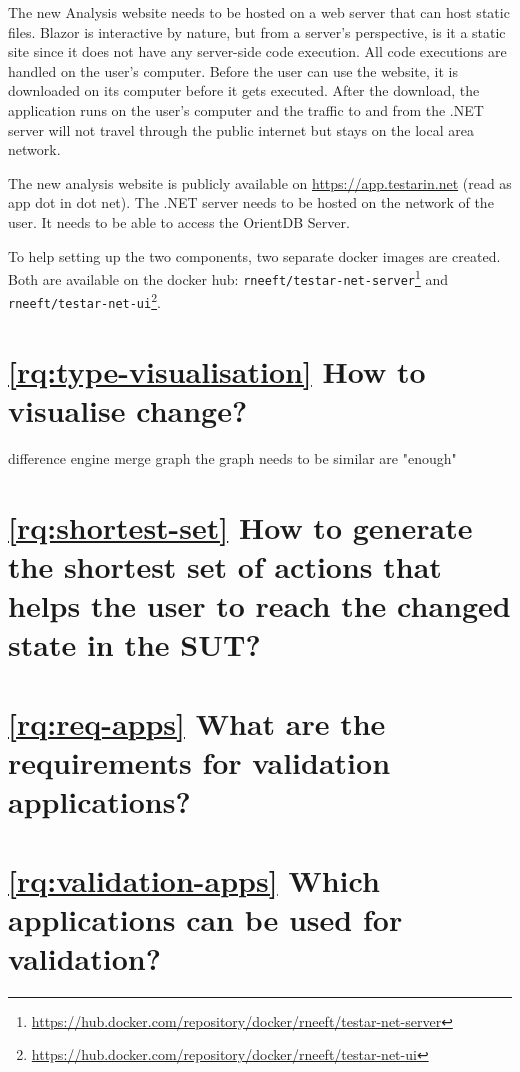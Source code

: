 The new \testar Analysis website needs to be hosted on a web server that can host static files. Blazor is interactive by nature, but from a server's perspective, is it a static site since it does not have any server-side code execution. All code executions are handled on the user's computer. Before the user can use the website, it is downloaded on its computer before it gets executed. After the download, the application runs on the user's computer and the traffic to and from the .NET server will not travel through the public internet but stays on the local area network. 

The new \testar analysis website is publicly available on \url{https://app.testarin.net} (read as app dot \testar in dot net). The .NET server needs to be hosted on the network of the user. It needs to be able to access the OrientDB Server. 

To help setting up the two components, two separate docker images are created. Both are available on the docker hub: \verb|rneeft/testar-net-server|\footnote{\url{https://hub.docker.com/repository/docker/rneeft/testar-net-server}} and \verb|rneeft/testar-net-ui|\footnote{\url{https://hub.docker.com/repository/docker/rneeft/testar-net-ui}}.

\section{\ref{rq:type-visualisation} How to visualise change?}

difference engine
merge graph \cite{andrews2009visual}
the graph needs to be similar are "enough"

\section{\ref{rq:shortest-set} How to generate the shortest set of actions that helps the user to reach the changed state in the SUT?}

\section{\ref{rq:req-apps} What are the requirements for validation applications?}

\section{\ref{rq:validation-apps} Which applications can be used for validation?}
